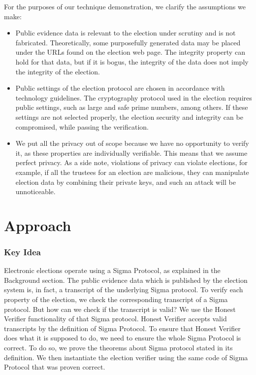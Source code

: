     For the purposes of our technique demonstration, we clarify the assumptions we make:
    \begin{itemize}
    \item Public evidence data is relevant to the election under scrutiny and is not fabricated. Theoretically, some purposefully generated data may be placed under the URLs found on the election web page. The integrity property can hold for that data, but if it is bogus, the integrity of the data does not imply the integrity of the election.
    \item Public settings of the election protocol are chosen in accordance with technology guidelines. The cryptography protocol used in the election requires public settings, such as large and safe prime numbers, among others. If these settings are not selected properly, the election security and integrity can be compromised, while passing the verification.
    \item We put all the privacy out of scope because we have no opportunity to verify it, as these properties are individually verifiable. This means that we assume perfect privacy. As a side note, violations of privacy can violate elections, for example, if all the trustees for an election are malicious, they can manipulate election data by combining their private keys, and such an attack will be unnoticeable.
    \end{itemize}
            
\section{Approach}

    \subsubsection{Key Idea}
    Electronic elections operate using a Sigma Protocol, as explained in the Background section. The public evidence data which is published by the election system is, in fact, a transcript of the underlying Sigma protocol. To verify each property of the election, we check the corresponding transcript of a Sigma protocol. But how can we check if the transcript is valid? We use the Honest Verifier functionality of that Sigma protocol. Honest Verifier accepts valid transcripts by the definition of Sigma Protocol. To ensure that Honest Verifier does what it is supposed to do, we need to ensure the whole Sigma Protocol is correct. To do so, we prove the theorems about Sigma protocol stated in its definition. We then instantiate the election verifier using the same code of Sigma Protocol that was proven correct.
    
